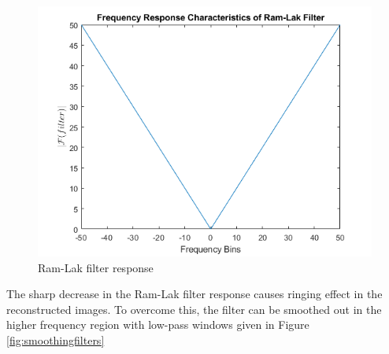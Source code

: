 \documentclass[journal]{IEEEtran}
\begin{document}
\begin{figure}[h]
	\centering
	\includegraphics[width=.8\columnwidth]{images/ramlak.png}
	\caption{Ram-Lak filter response}\label{fig:barthannresp}
	\end{figure}

The sharp decrease in the Ram-Lak filter response causes ringing effect in the reconstructed images. To overcome this, the filter can be smoothed out in the higher frequency region with low-pass windows given in Figure \ref{fig:smoothingfilters}
\end{document}
